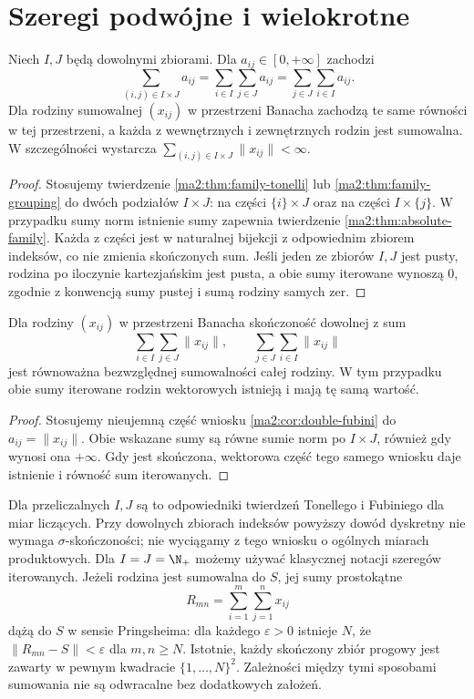 \section{Szeregi podwójne i wielokrotne}

\begin{wniosek}
\label{ma2:cor:double-fubini}
Niech $I,J$ będą dowolnymi zbiorami.
Dla $a_{ij}\in[0,+\infty]$ zachodzi
\[
 \sum_{(i,j)\in I\times J}a_{ij}
 =\sum_{i\in I}\sum_{j\in J}a_{ij}
 =\sum_{j\in J}\sum_{i\in I}a_{ij}.
\]
Dla rodziny sumowalnej $(x_{ij})$ w przestrzeni
Banacha zachodzą te same równości w tej przestrzeni,
a każda z wewnętrznych i zewnętrznych rodzin
jest sumowalna. W szczególności wystarcza
$\sum_{(i,j)\in I\times J}\|x_{ij}\|<\infty$.
\end{wniosek}
\begin{proof}
Stosujemy twierdzenie \ref{ma2:thm:family-tonelli}
lub \ref{ma2:thm:family-grouping} do dwóch podziałów
$I\times J$: na części $\{i\}\times J$ oraz na części
$I\times\{j\}$. W przypadku sumy norm istnienie
sumy zapewnia twierdzenie \ref{ma2:thm:absolute-family}.
Każda z części jest w naturalnej bijekcji z odpowiednim
zbiorem indeksów, co nie zmienia skończonych sum.
Jeśli jeden ze zbiorów $I,J$ jest pusty, rodzina
po iloczynie kartezjańskim jest pusta, a obie
sumy iterowane wynoszą $0$, zgodnie z konwencją
sumy pustej i sumą rodziny samych zer.
\end{proof}

\begin{wniosek}
\label{ma2:cor:double-absolute-test}
Dla rodziny $(x_{ij})$ w przestrzeni Banacha
skończoność dowolnej z sum
\[
 \sum_{i\in I}\sum_{j\in J}\|x_{ij}\|,
 \qquad
 \sum_{j\in J}\sum_{i\in I}\|x_{ij}\|
\]
jest równoważna bezwzględnej sumowalności całej
rodziny. W tym przypadku obie sumy iterowane
rodzin wektorowych istnieją i mają tę samą wartość.
\end{wniosek}
\begin{proof}
Stosujemy nieujemną część wniosku
\ref{ma2:cor:double-fubini} do $a_{ij}=\|x_{ij}\|$.
Obie wskazane sumy są równe sumie norm po
$I\times J$, również gdy wynosi ona $+\infty$.
Gdy jest skończona, wektorowa część tego samego
wniosku daje istnienie i równość sum iterowanych.
\end{proof}

Dla przeliczalnych $I,J$ są to odpowiedniki twierdzeń
Tonellego i Fubiniego dla miar liczących. Przy dowolnych
zbiorach indeksów powyższy dowód dyskretny nie wymaga
$\sigma$-skończoności; nie wyciągamy z tego wniosku
o ogólnych miarach produktowych.
Dla $I=J=\N_+$ możemy używać klasycznej notacji
szeregów iterowanych. Jeżeli rodzina jest sumowalna
do $S$, jej sumy prostokątne
\[
 R_{mn}=\sum_{i=1}^m\sum_{j=1}^n x_{ij}
\]
dążą do $S$ w sensie Pringsheima: dla każdego
$\varepsilon>0$ istnieje $N$, że
$\|R_{mn}-S\|<\varepsilon$ dla $m,n\ge N$.
Istotnie, każdy skończony zbiór progowy jest zawarty
w pewnym kwadracie $\{1,\ldots,N\}^2$.
Zależności między tymi sposobami sumowania nie są
odwracalne bez dodatkowych założeń.

